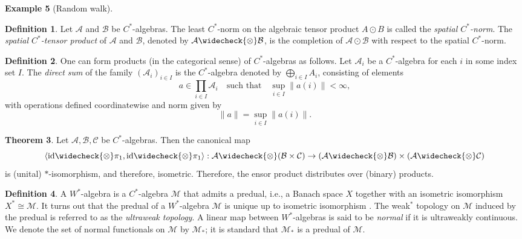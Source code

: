 \documentclass[10pt,a4paper]{amsart}
\theoremstyle{definition}
\newtheorem{definition}{Definition}[section]
\theoremstyle{definition}
\newtheorem{example}[definition]{Example}
\theoremstyle{definition}
\theoremstyle{definition}
\theoremstyle{definition}
\theoremstyle{definition}
\newtheorem{theorem}[definition]{Theorem}
\begin{document}
\begin{example}[Random walk]

\begin{definition}
  Let \( \mathcal{A} \) and \(  \mathcal{B} \) be \( C^* \)-algebras. The least \( C^* \)-norm on the algebraic tensor product \( A \odot B \) is called the \emph{spatial \( C^* \)-norm}.  
The \emph{spatial \( C^* \)-tensor product} of \( \mathcal{A} \) and \( \mathcal{B} \), denoted by \( \mathcal{A} \widecheck{\otimes} \mathcal{B} \), is the completion of \(  \mathcal{A} \odot \mathcal{B} \) with respect to the spatial \( C^* \)-norm.
\end{definition}


\begin{definition} \label{def:c*_direct_sum}
  One can form products (in the categorical sense) of \( C^* \)-algebras as follows.  
Let \( \mathcal{A}_i \) be a \( C^* \)-algebra for each \( i \) in some index set \( I \).  
The \emph{direct sum} of the family \( (\mathcal{A}_i)_{i \in I} \) is the \( C^* \)-algebra denoted by \( \bigoplus_{i \in I} A_i \), consisting of elements
\[
a \in \prod_{i \in I} \mathcal{A}_i \quad \text{such that} \quad \sup_{i \in I} \|a(i)\| < \infty,
\]
with operations defined coordinatewise and norm given by
\[
\|a\| = \sup_{i \in I} \|a(i)\|.
\]
\end{definition}

\begin{theorem} \cite[Theorem 3.1]{choSemanticsQuantumProgramming2016} \label{thm:c*_tensor_distributes_product}
  Let \( \mathcal{A}, \mathcal{B}, \mathcal{C} \) be \(C^*\)-algebras. Then the canonical map
\[
 \langle \id \widecheck{\otimes} \pi_1, \id \widecheck{\otimes} \pi_1 \rangle : \mathcal{A} \widecheck{\otimes} (\mathcal{B} \times \mathcal{C}) \to (\mathcal{A} \widecheck{\otimes} \mathcal{B}) \times (\mathcal{A} \widecheck{\otimes} \mathcal{C})
\]
is (unital) $*$-isomorphism, and therefore, isometric. Therefore, the ensor product distributes over (binary) products. 
\end{theorem}

\begin{definition}
A \( W^* \)-algebra is a \( C^* \)-algebra \( \mathcal{M} \) that admits a predual, i.e., a Banach space \( X \) together with an isometric isomorphism \( X^* \cong  \mathcal{M} \). It turns out that the predual of a \( W^* \)-algebra \(  \mathcal{M} \) is unique up to isometric isomorphism \cite[Corollary 1.13.3]{sakaiCAlgebrasWAlgebras1998}. 
The weak\(^*\) topology on \(  \mathcal{M} \) induced by the predual is referred to as the \emph{ultraweak topology}. A linear map between \( W^* \)-algebras 
is said to be \emph{normal} if it is ultraweakly continuous.
We denote the set of normal functionals on \(  \mathcal{M} \) by \(  \mathcal{M}_* \); it is standard that \(  \mathcal{M}_* \) is a predual of \(  \mathcal{M} \).
\end{definition}


\end{example}
\end{document}
